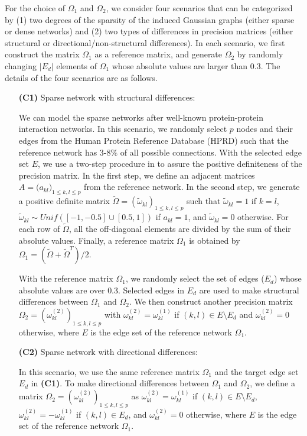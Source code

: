 \documentclass[useAMS,usenatbib,referee]{bio}
\begin{document}
{For the choice of $\Omega_1$ and $\Omega_2$,  we consider four scenarios that can be categorized by (1) two degrees of the sparsity of the induced Gaussian graphs (either sparse or dense networks) and (2) two types of differences in precision matrices (either structural or directional/non-structural differences).
In each scenario, we first construct the matrix $\Omega_1$ as a reference matrix, and generate $\Omega_2$ by randomly changing $|E_d|$ elements of $\Omega_1$ whose absolute values are larger than $0.3$.
The details of the four scenarios are as follows.


\begin{itemize}
\item[{\bf (C1)}] Sparse network with structural differences:

We can model the sparse networks after well-known protein-protein interaction networks.
In this scenario, we randomly select $p$ nodes and their edges from the Human Protein Reference Database (HPRD) \citep{Prasad:2009}  such that the reference network has $3$-$8\%$ of all possible connections.
With the selected edge set $E$, we use a two-step procedure in \citet{Peng:2009} to assure the positive definiteness of the precision matrix.
In the first step, we define an adjacent matrices $A=\big(a_{kl} \big)_{1 \le k,l \le p}$ from the reference network.
In the second step, we generate a positive definite matrix 
$\tilde{\Omega}= (\tilde{\omega}_{kl})_{1 \le k,l \le p}$ 
such that $\tilde{\omega}_{kl} = 1$ if $k = l$, $\tilde{\omega}_{kl} \sim Unif([-1,-0.5] \cup [0.5, 1])$
if $a_{kl} = 1$, and $\tilde{\omega}_{kl} = 0$ otherwise.
For each row of $\tilde{\Omega}$, all the off-diagonal elements are divided by the sum of their absolute values. Finally, a reference matrix $\Omega_1 $ is obtained by
$\Omega_1 = (\tilde{\Omega} + \tilde{\Omega}^T)/2$.  

With the reference matrix $\Omega_1$, 
we randomly select the set of edges ($E_d$) whose absolute values
are over $0.3$. Selected edges in $E_d$ are used to make structural differences between $\Omega_1$ and $\Omega_2$. 
We then construct another precision matrix 
$\Omega_2 = (\omega^{(2)}_{kl})_{1 \le k,l \le p}$ 
with $\omega^{(2)}_{kl} = \omega^{(1)}_{kl}$ if $(k,l) \in E \setminus E_d$ and $\omega^{(2)}_{kl} = 0$ otherwise, where $E$ is the edge set of the reference network $\Omega_1$. 


\item[{\bf (C2)}] Sparse network with directional differences:

In this scenario, we use the same reference matrix $\Omega_1$ and the target edge set $E_d$ in {\bf (C1)}.
To make directional differences between $\Omega_1$ and $\Omega_2$,
we define a matrix $\Omega_2 = (\omega^{(2)}_{kl})_{1 \le k,l \le p}$  as $\omega^{(2)}_{kl} = \omega^{(1)}_{kl}$ if $(k,l) \in E\setminus E_d$, $\omega^{(2)}_{kl} =  -\omega^{(1)}_{kl}$ if $(k,l) \in E_d$, and $\omega^{(2)}_{kl} = 0$ otherwise, where
$E$ is the edge set of the reference network $\Omega_1$. 



\end{itemize}}
\end{document}
